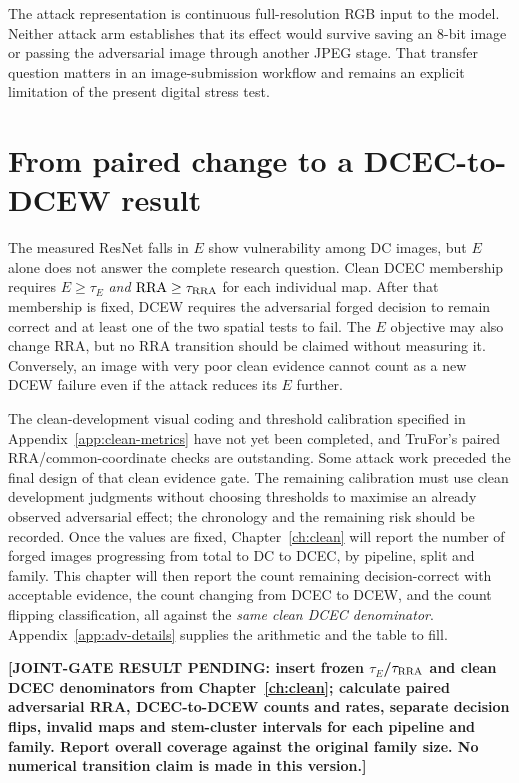 The attack representation is continuous full-resolution RGB input to the model. Neither attack arm establishes that its effect would survive saving an 8-bit image or passing the adversarial image through another JPEG stage. That transfer question matters in an image-submission workflow and remains an explicit limitation of the present digital stress test.

\section{From paired change to a DCEC-to-DCEW result}
\label{sec:adv-dcew}

The measured ResNet falls in $E$ show vulnerability among DC images, but $E$ alone does not answer the complete research question. Clean DCEC membership requires $E\geq\tau_E$ \emph{and} $\mathrm{RRA}\geq\tau_{\rm RRA}$ for each individual map. After that membership is fixed, DCEW requires the adversarial forged decision to remain correct and at least one of the two spatial tests to fail. The $E$ objective may also change RRA, but no RRA transition should be claimed without measuring it. Conversely, an image with very poor clean evidence cannot count as a new DCEW failure even if the attack reduces its $E$ further.

The clean-development visual coding and threshold calibration specified in Appendix~\ref{app:clean-metrics} have not yet been completed, and TruFor's paired RRA/common-coordinate checks are outstanding. Some attack work preceded the final design of that clean evidence gate. The remaining calibration must use clean development judgments without choosing thresholds to maximise an already observed adversarial effect; the chronology and the remaining risk should be recorded. Once the values are fixed, Chapter~\ref{ch:clean} will report the number of forged images progressing from total to DC to DCEC, by pipeline, split and family. This chapter will then report the count remaining decision-correct with acceptable evidence, the count changing from DCEC to DCEW, and the count flipping classification, all against the \emph{same clean DCEC denominator}. Appendix~\ref{app:adv-details} supplies the arithmetic and the table to fill.

\par\medskip\noindent\textbf{[JOINT-GATE RESULT PENDING: insert frozen $\tau_E$/$\tau_{\rm RRA}$ and clean DCEC denominators from Chapter~\ref{ch:clean}; calculate paired adversarial RRA, DCEC-to-DCEW counts and rates, separate decision flips, invalid maps and stem-cluster intervals for each pipeline and family. Report overall coverage against the original family size. No numerical transition claim is made in this version.]}\par\medskip

